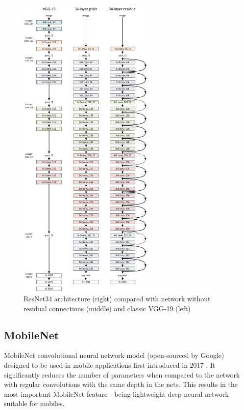\documentclass[../Main.tex]{subfiles}
\begin{document}
    \begin{figure}[ht!]
        \centering
        \includegraphics[width=0.6\textwidth]{Images/02_resnet34.png}
        \caption{ResNet34 architecture (right) compared with network without residual connections (middle) and classic VGG-19 (left) \cite{tds-resnet}}
        \label{fig:resnet34}
    \end{figure}

\newpage

\subsection{MobileNet}
    MobileNet convolutional neural network model (open-sourced by Google) designed to be used in mobile applications first introduced in 2017 \cite{MobileNet2017}. It significantly reduces the number of parameters when compared to the network with regular convolutions with the same depth in the nets. This results in the most important MobileNet feature - being lightweight deep neural network suitable for mobiles.
    
\end{document}
